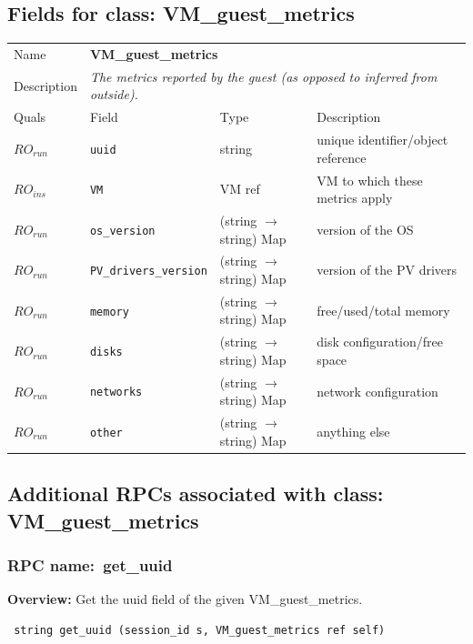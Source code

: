 \subsection{Fields for class: VM\_guest\_metrics}
\begin{longtable}{|lllp{}|}
\hline
\multicolumn{1}{|l}{Name} & \multicolumn{3}{l|}{\bf VM\_guest\_metrics} \\
\multicolumn{1}{|l}{Description} & \multicolumn{3}{l|}{\parbox{11cm}{\em
The metrics reported by the guest (as opposed to inferred from outside).}} \\
\hline
Quals & Field & Type & Description \\
\hline
$\mathit{RO}_\mathit{run}$ &  {\tt uuid} & string & unique identifier/object reference \\
$\mathit{RO}_\mathit{ins}$ &  {\tt VM} & VM ref & VM to which these metrics apply \\
$\mathit{RO}_\mathit{run}$ &  {\tt os\_version} & (string $\rightarrow$ string) Map & version of the OS \\
$\mathit{RO}_\mathit{run}$ &  {\tt PV\_drivers\_version} & (string $\rightarrow$ string) Map & version of the PV drivers \\
$\mathit{RO}_\mathit{run}$ &  {\tt memory} & (string $\rightarrow$ string) Map & free/used/total memory \\
$\mathit{RO}_\mathit{run}$ &  {\tt disks} & (string $\rightarrow$ string) Map & disk configuration/free space \\
$\mathit{RO}_\mathit{run}$ &  {\tt networks} & (string $\rightarrow$ string) Map & network configuration \\
$\mathit{RO}_\mathit{run}$ &  {\tt other} & (string $\rightarrow$ string) Map & anything else \\
\hline
\end{longtable}
\subsection{Additional RPCs associated with class: VM\_guest\_metrics}
\subsubsection{RPC name:~get\_uuid}

{\bf Overview:} 
Get the uuid field of the given VM\_guest\_metrics.

\begin{verbatim} string get_uuid (session_id s, VM_guest_metrics ref self)\end{verbatim}


